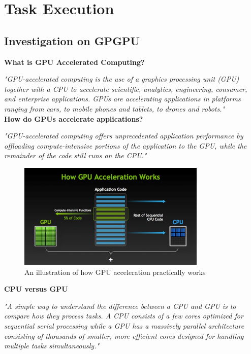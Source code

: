 \documentclass[11pt, a4paper]{article}
\begin{document}
\newpage

\section{Task Execution}
\subsection{Investigation on GPGPU}

\textbf{What is GPU Accelerated Computing?}

\textit{"GPU-accelerated computing is the use of a graphics processing unit (GPU) together with a CPU to accelerate scientific, analytics, engineering, consumer, and enterprise applications. GPUs are accelerating applications in platforms ranging from cars, to mobile phones and tablets, to drones and robots."}\cite{nvidia-whatis-gpuac}\\

\textbf{How do GPUs accelerate applications?}

\textit{"GPU-accelerated computing offers unprecedented application performance by offloading compute-intensive portions of the application to the GPU, while the remainder of the code still runs on the CPU."}\cite{nvidia-whatis-gpuac}\\

\begin{figure}[h!]
	\centering
	\includegraphics[width=0.8\textwidth]{how-gpu-acceleration-works}
	\caption{An illustration of how GPU acceleration practically works \cite{how-gpu-acc-works}}
\end{figure}

\textbf{CPU versus GPU}

\textit{"A simple way to understand the difference between a CPU and GPU is to compare how they process tasks. A CPU consists of a few cores optimized for sequential serial processing while a GPU has a massively parallel architecture consisting of thousands of smaller, more efficient cores designed for handling multiple tasks simultaneously."}\cite{nvidia-whatis-gpuac}
\end{document}
